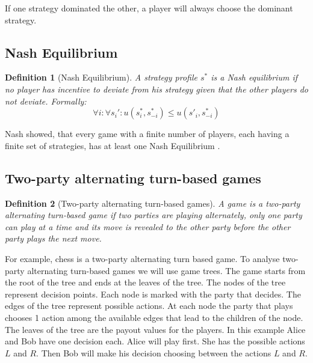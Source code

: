 \documentclass{cacthesis}
\newtheorem{definition}{Definition}
\begin{document}
If one strategy dominated the other, a player will always choose the dominant strategy.
\subsection{Nash Equilibrium}
\begin{definition}[Nash Equilibrium]
A strategy profile $s^*$ is a Nash equilibrium if no player has incentive to deviate from his strategy given that the other players do not deviate. {\normalfont \cite{rasmusen_games_nodate}} Formally: \begin{equation}
    \forall i: \forall s_i': u(s^*_i,s^*_{-i}) \leq u(s'_i,s^*_{-i})
\end{equation}
\end{definition}
Nash showed, that every game with a finite number of players, each having a finite set of strategies, has at least one Nash Equilibrium \cite{nash1950}.
\subsection{Two-party alternating turn-based games}
\begin{definition}[Two-party alternating turn-based games]
\label{def:turn-based-game}
A game is a two-party alternating turn-based game if two parties are playing alternately, only one party can play at a time and its move is revealed
to the other party before the other party plays the next move.
\end{definition}
For example, chess is a two-party alternating turn based game. To analyse two-party alternating turn-based games we will use game trees. The game starts from the root of the tree and ends at the leaves of the tree. The nodes of the tree represent decision points. Each node is marked with the party that decides. The edges of the tree represent possible actions. At each node the party that plays chooses 1 action among the available edges that lead to the children of the node. The leaves of the tree are the payout values for the players. In this example Alice and Bob have one decision each. Alice will play first. She has the possible actions $L$ and $R$. Then Bob will make his decision choosing between the actions $L$ and $R$. \newline
\end{document}
